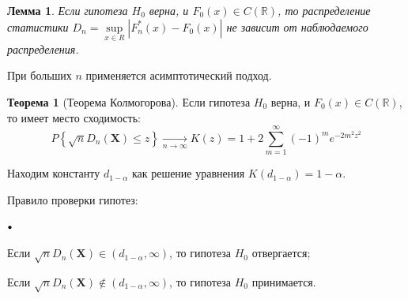\documentclass[oneside,final,14pt]{extreport}
\theoremstyle{plain}
\newtheorem*{lem}{Лемма}
\theoremstyle{definition}
\theoremstyle{named}
\newtheorem*{namedthm}{Теорема}
\newcommand\sbullet[1][.5]{\mathbin{\vcenter{\hbox{\scalebox{#1}{$\bullet$}}}}}
\newenvironment{compactlist}{
\begin{list}{{$\sbullet[.75]$}}{
\setlength\partopsep{0pt}
\setlength\parskip{0pt}
\setlength\parsep{0pt}
\setlength\topsep{0pt}
\setlength\itemsep{0pt}
}
}{
\end{list}
}
\begin{document}
\begin{lem}
Если гипотеза $H_0$ верна, и $F_{0}(x) \in C(\mathbb{R})$, то распределение статистики $D_{n}=\sup\limits_{x \in R}|F_{n}^{*}(x)-F_{0}(x)|$ не зависит от наблюдаемого распределения.
\end{lem}

При больших $n$ применяется асимптотический подход.
\begin{namedthm}[Теорема Колмогорова]
Если гипотеза $H_0$ верна, и $F_{0}(x) \in C(\mathbb{R})$, то имеет место сходимость:
\begin{equation*}
    P\left\{\sqrt{n} D_{n}\left(\mathbf{X}\right) \leqslant z\right\} \underset{n \rightarrow \infty}{\longrightarrow} K(z)=1+2 \sum\limits_{m=1}^{\infty}(-1)^{m} e^{-2 m^{2} z^{2}}
\end{equation*}
\end{namedthm}

Находим константу $d_{1-\alpha}$ как решение уравнения $K\left(d_{1-\alpha}\right)=1-\alpha$.

Правило проверки гипотез:
\begin{compactlist}
    \item Если $\sqrt{n} D_{n}\left(\mathbf{X}\right) \in\left(d_{1-\alpha}, \infty\right)$, то гипотеза $H_0$ отвергается;
    \item Если $\sqrt{n} D_{n}\left(\mathbf{X}\right) \notin\left(d_{1-\alpha}, \infty\right)$, то гипотеза $H_0$ принимается.
\end{compactlist}
\end{document}
